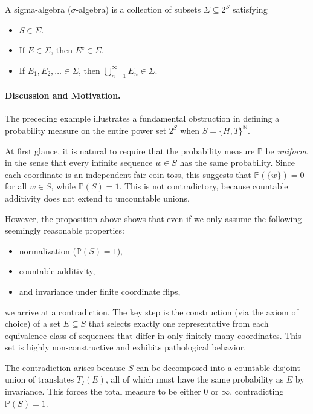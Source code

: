 \begin{definition}
    A sigma-algebra (\(\sigma \)-algebra) is a collection of subsets \(\Sigma \subseteq 2^S\) satisfying
    \begin{itemize}
        \item [(1)] \(S \in \Sigma\). 
        \item [(2)] If \(E \in \Sigma\), then \(E^c \in \Sigma\). 
        \item [(3)] If \(E_1, E_2, \dots \in \Sigma\), then \(\bigcup_{n=1}^{\infty} E_n \in \Sigma \).    
    \end{itemize} 
\end{definition}

\paragraph{Discussion and Motivation.}
The preceding example illustrates a fundamental obstruction in defining a probability measure on the entire power set $2^S$ when $S = \{H,T\}^{\mathbb{N}}$. 

At first glance, it is natural to require that the probability measure $\mathbb{P}$ be \emph{uniform}, in the sense that every infinite sequence $w \in S$ has the same probability. Since each coordinate is an independent fair coin toss, this suggests that $\mathbb{P}(\{w\}) = 0$ for all $w \in S$, while $\mathbb{P}(S) = 1$. This is not contradictory, because countable additivity does not extend to uncountable unions.

However, the proposition above shows that even if we only assume the following seemingly reasonable properties:
\begin{itemize}
    \item normalization ($\mathbb{P}(S) = 1$),
    \item countable additivity,
    \item and invariance under finite coordinate flips,
\end{itemize}
we arrive at a contradiction. The key step is the construction (via the axiom of choice) of a set $E \subseteq S$ that selects exactly one representative from each equivalence class of sequences that differ in only finitely many coordinates. This set is highly non-constructive and exhibits pathological behavior.

The contradiction arises because $S$ can be decomposed into a countable disjoint union of translates $T_I(E)$, all of which must have the same probability as $E$ by invariance. This forces the total measure to be either $0$ or $\infty$, contradicting $\mathbb{P}(S) = 1$.

